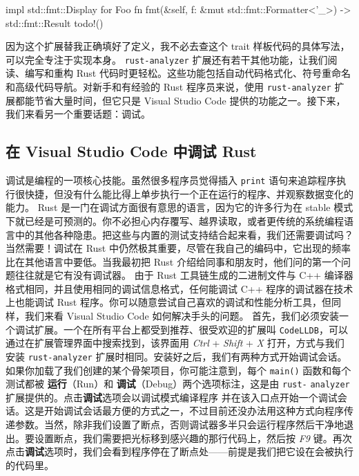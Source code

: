 \begin{codebox}[rust]
impl std::fmt::Display for Foo {
    fn fmt(&self, f: &mut std::fmt::Formatter<'_>) -> std::fmt::Result {
        todo!()
    }
}
\end{codebox}
因为这个扩展替我正确填好了定义，我不必去查这个 trait 样板代码的具体写法，可以完全专注于实现本身。
\label{idx:idx_145ef442}
\label{idx:idx_1199194a}
\texttt{rust-\allowbreak{}analyzer} 扩展还有若干其他功能，让我们阅读、编写和重构 Rust 代码时更轻松。这些功能包括自动代码格式化、符号重命名和高级代码导航。对新手和有经验的 Rust 程序员来说，使用 \texttt{rust-\allowbreak{}analyzer} 扩展都能节省大量时间，但它只是 Visual Studio Code 提供的功能之一。接下来，我们来看另一个重要话题：调试。
\subsection{在 Visual Studio Code 中调试 Rust}
\label{idx:idx_5a486e35}
调试是编程的一项核心技能。虽然很多程序员觉得插入 \texttt{print} 语句来追踪程序执行很快捷，但没有什么能比得上单步执行一个正在运行的程序、并观察数据变化的能力。
\label{idx:idx_fc9cc964}
Rust 是一门在调试方面很有意思的语言，因为它的许多行为在 stable 模式下就已经是可预测的。你不必担心内存覆写、越界读取，或者更传统的系统编程语言中的其他各种隐患。把这些与内置的测试支持结合起来看，我们还需要调试吗？
当然需要！调试在 Rust 中仍然极其重要，尽管在我自己的编码中，它出现的频率比在其他语言中要低。当我最初把 Rust 介绍给同事和朋友时，他们问的第一个问题往往就是它有没有调试器。
由于 Rust 工具链生成的二进制文件与 C++ 编译器格式相同，并且使用相同的调试信息格式，任何能调试 C++ 程序的调试器在技术上也能调试 Rust 程序。你可以随意尝试自己喜欢的调试和性能分析工具，但同样，我们来看 Visual Studio Code 如何解决手头的问题。
首先，我们必须安装一个调试扩展。一个在所有平台上都受到推荐、很受欢迎的扩展叫 \texttt{CodeLLDB}，可以通过在扩展管理界面中搜索找到，该界面用 \emph{Ctrl} + \emph{Shift} + \emph{X} 打开，方式与我们安装 \texttt{rust-\allowbreak{}analyzer} 扩展时相同。安装好之后，我们有两种方式开始调试会话。
如果你加载了我们创建的某个骨架项目，你可能注意到，每个 \texttt{main()} 函数和每个测试都被 \textbf{运行}（Run）和 \textbf{调试}（Debug）两个选项标注，这是由 \texttt{rust-}
\texttt{analyzer} 扩展提供的。点击\textbf{调试}选项会以调试模式编译程序
并在该入口点开始一个调试会话。这是开始调试会话最方便的方式之一，不过目前还没办法用这种方式向程序传递参数。当然，除非我们设置了断点，否则调试器多半只会运行程序然后干净地退出。要设置断点，我们需要把光标移到感兴趣的那行代码上，然后按 \emph{F9} 键。再次点击\textbf{调试}选项时，我们会看到程序停在了断点处——前提是我们把它设在会被执行的代码里。
